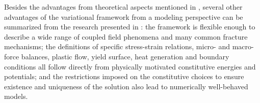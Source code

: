 
Besides the advantages from theoretical aspects mentioned in , several other advantages of the variational framework from a modeling perspective can be summarized from the research presented in :
the framework is flexible enough to describe a wide range of coupled field phenomena and many common fracture mechanisms; the definitions of specific stress-strain relations, micro- and macro-force balances, plastic flow, yield surface, heat generation and boundary conditions all follow directly from physically motivated constitutive energies and potentials; and the restrictions imposed on the constitutive choices to ensure existence and uniqueness of the solution also lead to numerically well-behaved models.


